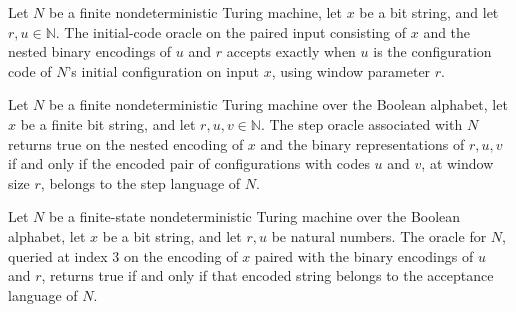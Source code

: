 \begin{lemma}
\label{Complexity.LogProg.ExpBFS.ini_orcN}
\leanok
{}
Let $N$ be a finite nondeterministic Turing machine, let $x$ be a bit string, and let
$r,u\in\mathbb N$. The initial-code oracle on the paired input consisting of $x$ and the
nested binary encodings of $u$ and $r$ accepts exactly when $u$ is the configuration
code of $N$'s initial configuration on input $x$, using window parameter $r$.
\end{lemma}

\begin{lemma}
\label{Complexity.LogProg.ExpBFS.stp_orcN}
\leanok
{}
Let $N$ be a finite nondeterministic Turing machine over the Boolean alphabet, let $x$
be a finite bit string, and let $r,u,v\in\mathbb N$. The step oracle associated with $N$
returns true on the nested encoding of $x$ and the binary representations of $r,u,v$ if
and only if the encoded pair of configurations with codes $u$ and $v$, at window size
$r$, belongs to the step language of $N$.
\end{lemma}

\begin{lemma}
\label{Complexity.LogProg.ExpBFS.acc_orcN}
\leanok
{}
Let $N$ be a finite-state nondeterministic Turing machine over the Boolean alphabet, let
$x$ be a bit string, and let $r,u$ be natural numbers. The oracle for $N$, queried at
index $3$ on the encoding of $x$ paired with the binary encodings of $u$ and $r$,
returns true if and only if that encoded string belongs to the acceptance language of
$N$.
\end{lemma}

